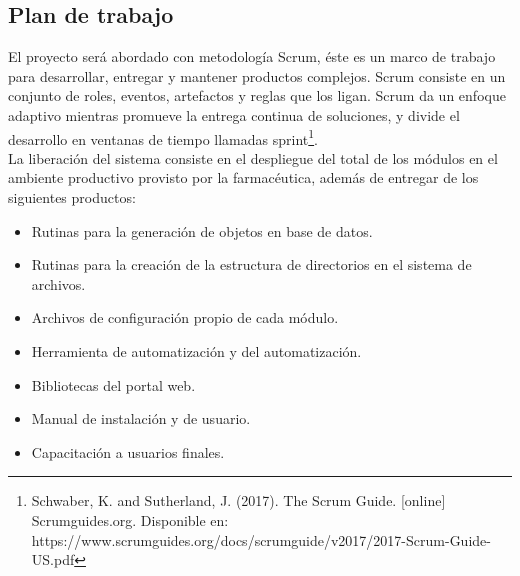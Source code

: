 \documentclass[a4paper,10pt]{article}
\begin{document}
\subsection{Plan de trabajo}
El proyecto será abordado con metodología Scrum, éste es un marco de trabajo para desarrollar, entregar y mantener productos complejos. Scrum consiste en un conjunto de roles, eventos, artefactos y reglas que los ligan. Scrum da un enfoque adaptivo mientras promueve la entrega continua de soluciones, y divide el desarrollo en ventanas de tiempo llamadas sprint\footnote{Schwaber, K. and Sutherland, J. (2017). The Scrum Guide. [online] Scrumguides.org. Disponible en: https://www.scrumguides.org/docs/scrumguide/v2017/2017-Scrum-Guide-US.pdf}.\\
La liberación del sistema consiste en el despliegue del total de los módulos en el ambiente productivo provisto por la farmacéutica, además de entregar de los siguientes productos:
\begin{itemize}
\item Rutinas para la generación de objetos en base de datos.
\item Rutinas para la creación de la estructura de directorios en el sistema de archivos.
\item Archivos de configuración propio de cada módulo.
\item Herramienta de automatización y del automatización.
\item Bibliotecas del portal web.
\item Manual de instalación y de usuario.
\item Capacitación a usuarios finales.
\end{itemize}
\end{document}
